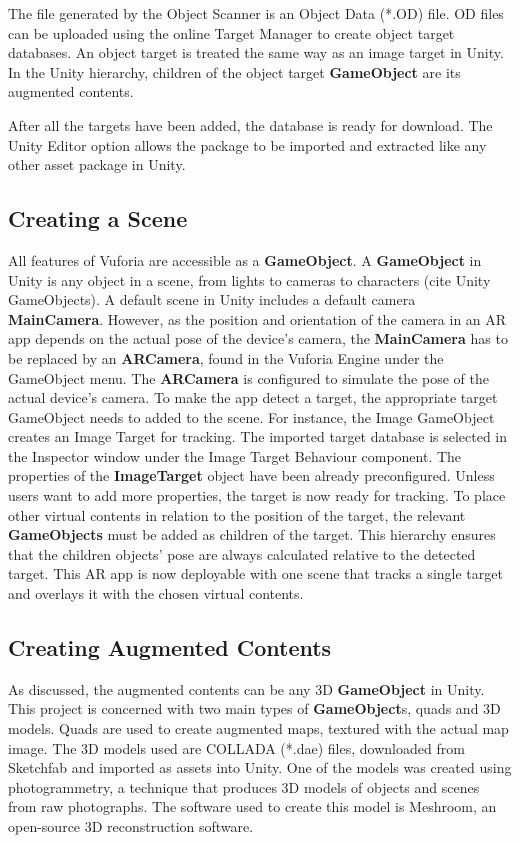 The file generated by the Object Scanner is an Object Data (*.OD) file. OD files can be uploaded using the online Target Manager to create object target databases. An object target is treated the same way as an image target in Unity. In the Unity hierarchy, children of the object target \textbf{GameObject} are its augmented contents.

After all the targets have been added, the database is ready for download. The Unity Editor option allows the package to be imported and extracted like any other asset package in Unity.

\subsection{Creating a Scene}
All features of Vuforia are accessible as a \textbf{GameObject}. A \textbf{GameObject} in Unity is any object in a scene, from lights to cameras to characters (cite Unity GameObjects). A default scene in Unity includes a default camera \textbf{MainCamera}. However, as the position and orientation of the camera in an AR app depends on the actual pose of the device's camera, the \textbf{MainCamera} has to be replaced by an \textbf{ARCamera}, found in the Vuforia Engine under the GameObject menu. The \textbf{ARCamera} is configured to simulate the pose of the actual device's camera. To make the app detect a target, the appropriate target GameObject needs to added to the scene. For instance, the Image GameObject creates an Image Target for tracking. The imported target database is selected in the Inspector window under the Image Target Behaviour component. The properties of the \textbf{ImageTarget} object have been already preconfigured. Unless users want to add more properties, the target is now ready for tracking. To place other virtual contents in relation to the position of the target,  the relevant \textbf{GameObjects} must be added as children of the target. This hierarchy ensures that the children objects' pose are always calculated relative to the detected target. This AR app is now deployable with one scene that tracks a single target and overlays it with the chosen virtual contents.

\subsection{Creating Augmented Contents}
As discussed, the augmented contents can be any 3D \textbf{GameObject} in Unity. This project is concerned with two main types of \textbf{GameObject}s, quads and 3D models. Quads are used to create augmented maps, textured with the actual map image. The 3D models used are COLLADA (*.dae) files, downloaded from Sketchfab and imported as assets into Unity. One of the models was created using photogrammetry, a technique that produces 3D models of objects and scenes from raw photographs. The software used to create this model is Meshroom, an open-source 3D reconstruction software.

